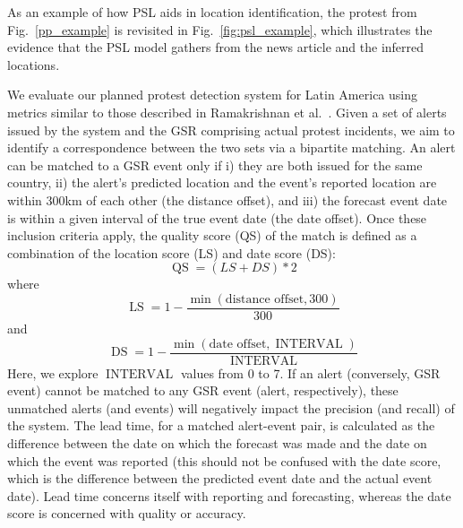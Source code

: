 \documentclass[letterpaper]{article}
\begin{document}
As an example of how PSL aids in location identification,
the protest from Fig.~\ref{pp_example} is revisited in
Fig.~\ref{fig:psl_example}, which illustrates
the evidence that the PSL model gathers from the news article and the
inferred locations.

\begin{figure*}
  \centering
\caption{An example of location inference using PSL. Red circles
   denote named entities identified as locations and blue denotes other
   types of entities. The article describes students planning a march on
   Sunday.  It identifies multiple locations, e.g., Chacao, El Roso, and
   the Francisco Fajardo highway where protests have been happening.
   There is also a reference to a quote by the mayor of Baruto.
   Mentions of such multiple locations are resolved using our PSL
   program to the intended location, here Caracas.}
\label{fig:psl_example}
\end{figure*}
We evaluate our planned protest detection system for Latin America using
metrics similar to those described in Ramakrishnan et
al.~.  Given a set of alerts issued by the system
and the GSR comprising actual protest incidents, we aim to identify a
correspondence between the two sets via a bipartite matching.  An alert
can be matched to a GSR event only if i) they are both issued for the
same country, ii) the alert's predicted location and the event's
reported location are within 300km of each other (the distance offset),
and iii) the forecast event date is within a given interval of the true
event date (the date offset).  Once these inclusion criteria apply, the
quality score (QS) of the match is defined as a combination of the
location score (LS) and date score (DS):
\small
\begin{equation}
    \operatorname{QS}= (LS + DS)*2
\end{equation}
\normalsize
\noindent
where
\small
\begin{equation}
    \operatorname{LS}=1 - \frac{\min(\textrm{distance offset}, 300)}{300}
\end{equation}
and 
\begin{equation}
    \operatorname{DS}=1 - \frac{\min(\textrm{date offset}, \operatorname{INTERVAL})}{\operatorname{INTERVAL}}
\end{equation}
\normalsize
Here, we explore $\operatorname{INTERVAL}$ values from \textsc{0} to
\textsc{7}.  If
an alert (conversely, GSR event) cannot be matched to any GSR event
(alert, respectively), these unmatched alerts (and events) will
negatively impact the precision (and recall) of the system. The lead
time, for a matched alert-event pair, is calculated as the difference
between the date on which the forecast was made and the date on which
the event was reported (this should not be confused with the date score,
which is the difference between the predicted event date and the actual
event date). Lead time concerns itself with reporting and forecasting,
whereas the date score is concerned with quality or accuracy.
\end{document}

